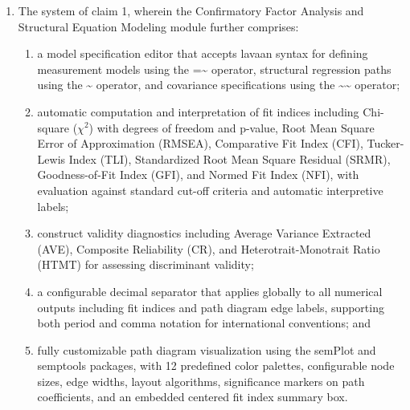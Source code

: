 \documentclass[12pt,a4paper]{article}
\begin{document}
\begin{enumerate}[leftmargin=3em, labelsep=1em, itemsep=12pt]
\begin{enumerate}[label=\alph*., leftmargin=2em, itemsep=2pt]
\item a Confirmatory Factor Analysis (CFA) and Structural Equation Modeling (SEM) module for testing hypothesized measurement and structural models using the lavaan framework, supporting multiple estimators including ML, MLR, WLSMV, and ULS;
\item a standardized model comparison framework that operates consistently across all analytical modules, providing sortable interactive fit index tables and interpretive guidance; and
\item an automated reporting system that generates formatted HTML documents containing narrative interpretation, APA-formatted tables, and embedded visualizations.
\end{enumerate}

\item The system of claim 1, wherein the Confirmatory Factor Analysis and Structural Equation Modeling module further comprises:
\begin{enumerate}[label=\alph*., leftmargin=2em, itemsep=2pt]
\item a model specification editor that accepts lavaan syntax for defining measurement models using the =\textasciitilde{} operator, structural regression paths using the \textasciitilde{} operator, and covariance specifications using the \textasciitilde{}\textasciitilde{} operator;
\item automatic computation and interpretation of fit indices including Chi-square ($\chi^2$) with degrees of freedom and p-value, Root Mean Square Error of Approximation (RMSEA), Comparative Fit Index (CFI), Tucker-Lewis Index (TLI), Standardized Root Mean Square Residual (SRMR), Goodness-of-Fit Index (GFI), and Normed Fit Index (NFI), with evaluation against standard cut-off criteria and automatic interpretive labels;
\item construct validity diagnostics including Average Variance Extracted (AVE), Composite Reliability (CR), and Heterotrait-Monotrait Ratio (HTMT) for assessing discriminant validity;
\item a configurable decimal separator that applies globally to all numerical outputs including fit indices and path diagram edge labels, supporting both period and comma notation for international conventions; and
\item fully customizable path diagram visualization using the semPlot and semptools packages, with 12 predefined color palettes, configurable node sizes, edge widths, layout algorithms, significance markers on path coefficients, and an embedded centered fit index summary box.
\end{enumerate}


\end{enumerate}
\end{document}
